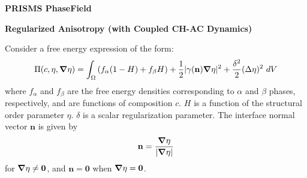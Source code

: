\documentclass[10pt]{article}
\newcommand{\gv}[1]{\ensuremath{\mbox{\boldmath$ #1 $}}}
\newcommand{\grad}[1]{\gv{\nabla} #1}
\begin{document}
\def\Bomega{\mbox{\boldmath$\omega$}}
\def\Bvarepsilon{\mbox{\boldmath$\varepsilon$}}
\def\Bvartheta{\mbox{\boldmath$\vartheta$}}
\def\Bvarpi{\mbox{\boldmath$\varpi$}}
\def\Bvarrho{\mbox{\boldmath$\varrho$}}
\def\Bvarsigma{\mbox{\boldmath$\varsigma$}}
\def\Bvarphi{\mbox{\boldmath$\varphi$}}
\def\bone{\mathbf{1}}
\def\bzero{\mathbf{0}}
\def\bA{\mbox{\boldmath$ A$}}
\def\bB{\mbox{\boldmath$ B$}}
\def\bC{\mbox{\boldmath$ C$}}
\def\bD{\mbox{\boldmath$ D$}}
\def\bE{\mbox{\boldmath$ E$}}
\def\bF{\mbox{\boldmath$ F$}}
\def\bG{\mbox{\boldmath$ G$}}
\def\bH{\mbox{\boldmath$ H$}}
\def\bI{\mbox{\boldmath$ I$}}
\def\bJ{\mbox{\boldmath$ J$}}
\def\bK{\mbox{\boldmath$ K$}}
\def\bL{\mbox{\boldmath$ L$}}
\def\bM{\mbox{\boldmath$ M$}}
\def\bN{\mbox{\boldmath$ N$}}
\def\bO{\mbox{\boldmath$ O$}}
\def\bP{\mbox{\boldmath$ P$}}
\def\bQ{\mbox{\boldmath$ Q$}}
\def\bR{\mbox{\boldmath$ R$}}
\def\bS{\mbox{\boldmath$ S$}}
\def\bT{\mbox{\boldmath$ T$}}
\def\bU{\mbox{\boldmath$ U$}}
\def\bV{\mbox{\boldmath$ V$}}
\def\bW{\mbox{\boldmath$ W$}}
\def\bX{\mbox{\boldmath$ X$}}
\def\bY{\mbox{\boldmath$ Y$}}
\def\bZ{\mbox{\boldmath$ Z$}}
\def\ba{\mbox{\boldmath$ a$}}
\def\bb{\mbox{\boldmath$ b$}}
\def\bc{\mbox{\boldmath$ c$}}
\def\bd{\mbox{\boldmath$ d$}}
\def\be{\mbox{\boldmath$ e$}}
\def\bff{\mbox{\boldmath$ f$}}
\def\bg{\mbox{\boldmath$ g$}}
\def\bh{\mbox{\boldmath$ h$}}
\def\bi{\mbox{\boldmath$ i$}}
\def\bj{\mbox{\boldmath$ j$}}
\def\bk{\mbox{\boldmath$ k$}}
\def\bl{\mbox{\boldmath$ l$}}
\def\bm{\mbox{\boldmath$ m$}}
\def\bn{\mbox{\boldmath$ n$}}
\def\bo{\mbox{\boldmath$ o$}}
\def\bp{\mbox{\boldmath$ p$}}
\def\bq{\mbox{\boldmath$ q$}}
\def\br{\mbox{\boldmath$ r$}}
\def\bs{\mbox{\boldmath$ s$}}
\def\bt{\mbox{\boldmath$ t$}}
\def\bu{\mbox{\boldmath$ u$}}
\def\bv{\mbox{\boldmath$ v$}}
\def\bw{\mbox{\boldmath$ w$}}
\def\bx{\mbox{\boldmath$ x$}}
\def\by{\mbox{\boldmath$ y$}}
\def\bz{\mbox{\boldmath$ z$}}
\centerline{\Large{\bf PRISMS PhaseField}}
\smallskip
\centerline{\Large{\bf Regularized Anisotropy (with Coupled CH-AC Dynamics)}}
\bigskip

Consider a free energy expression of the form:
\begin{equation}
  \Pi(c, \eta, \grad  \eta) = \int_{\Omega}    \left( f_{\alpha}(1-H) + f_{\beta}H \right)  + \frac{1}{2} | \gamma( \mathbf{n} ) \grad  \eta |^2  + \frac{\delta^2}{2} (\Delta \eta)^2 ~dV 
\end{equation}
where $f_{\alpha}$ and $f_{\beta}$ are the free energy densities corresponding to $\alpha$ and $\beta$ phases, respectively, and are functions of composition $c$. $H$ is a function of the structural order parameter $\eta$.  $\delta$ is a scalar regularization parameter.  The interface normal vector $\mathbf{n}$ is given by 
\begin{equation}
\mathbf{n} = \frac{\grad \eta}{|\grad \eta|}
\end{equation}
for $\grad \eta \ne \mathbf{0}$, and $\mathbf{n} = \mathbf{0}$ when $\grad \eta = \mathbf{0}$.
\end{document}
